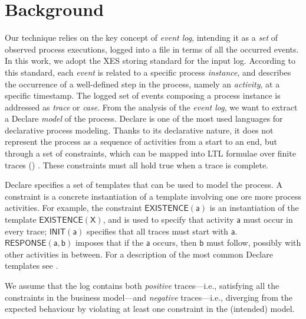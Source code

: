 
\section{Background}\label{sec:back}

Our technique relies on the key concept of \emph{event log}, intending it as a \emph{set} of observed process executions, logged into a file in terms of all the occurred events.
%
%
In this work, we adopt the \ac{XES} storing standard \cite{XES} for the input log. According to this standard, each \emph{event} is related to a specific process \emph{instance}, and describes the occurrence of a well-defined step in the process, namely an \emph{activity}, at a specific timestamp. The logged set of events composing a process instance is addressed as \emph{trace} or \emph{case}. 
From the analysis of the \emph{event log}, we want to extract a Declare \cite{2008-Pesic,2009-Aalst} \emph{model} of the process.
Declare is one of the most used languages for declarative process modeling. Thanks to its declarative nature, it does not represent the process as a sequence of activities from a start to an end, but through a set of constraints, which can be mapped into \ac{LTL} formulae over finite traces (\ltlf) \cite{DBLP:journals/tweb/MontaliPACMS10,DBLP:conf/ijcai/GiacomoV13}. These constraints must all hold true when a trace is complete.

Declare specifies a set of templates that can be used to model the process. 
A constraint is a concrete instantiation of a template involving one ore more process activities.
For example, the constraint $\mathsf{EXISTENCE(a)}$ is an instantiation of the template $\mathsf{EXISTENCE(X)}$, and is used to specify that activity $\mathsf{a}$ must occur in every trace; $\mathsf{INIT(a)}$ specifies that all traces must start with $\mathsf{a}$. $\mathsf{RESPONSE(a,b)}$ imposes that if the $\mathsf{a}$ occurs, then $\mathsf{b}$ must follow, possibly with other activities in between. %
For a description of the most common Declare templates see \cite{2008-Pesic}. 

We assume that the log contains both \emph{positive} traces---i.e., satisfying all the constraints in the business model---and \emph{negative} traces---i.e., diverging from the expected behaviour by violating at least one constraint in the (intended) model. 

